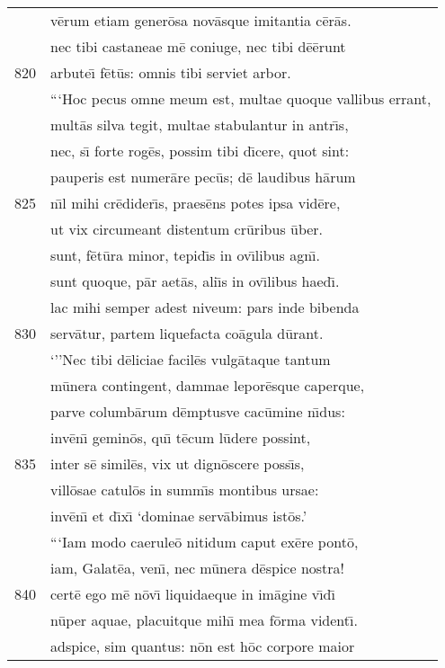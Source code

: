 \documentclass[paper=6in:9in,pagesize=pdftex,
               headinclude=on,footinclude=on,12pt]{scrbook}
\begin{document}
\begin{longtable}[p]{ r l }
 & v\=erum etiam gener\=osa nov\=asque imitantia c\=er\=as.\\ 
 & nec tibi castaneae m\=e coniuge, nec tibi d\=e\=erunt\\ 
820 & arbute\={\i} f\=et\=us: omnis tibi serviet arbor.\\ 
 & \indent ```Hoc pecus omne meum est, multae quoque vallibus errant,\\ 
 & mult\=as silva tegit, multae stabulantur in antr\={\i}s,\\ 
 & nec, s\={\i} forte rog\=es, possim tibi d\={\i}cere, quot sint:\\ 
 & pauperis est numer\=are pec\=us; d\=e laudibus h\=arum\\ 
825 & n\={\i}l mihi cr\=edider\={\i}s, praes\=ens potes ipsa vid\=ere,\\ 
 & ut vix circumeant distentum cr\=uribus \=uber.\\ 
 & sunt, f\=et\=ura minor, tepid\={\i}s in ov\={\i}libus agn\={\i}.\\ 
 & sunt quoque, p\=ar aet\=as, ali\={\i}s in ov\={\i}libus haed\={\i}.\\ 
 & lac mihi semper adest niveum: pars inde bibenda\\ 
830 & serv\=atur, partem liquefacta co\=agula d\=urant.\\ 
 & \indent `''Nec tibi d\=eliciae facil\=es vulg\=ataque tantum\\ 
 & m\=unera contingent, dammae lepor\=esque caperque,\\ 
 & parve columb\=arum d\=emptusve cac\=umine n\={\i}dus:\\ 
 & inv\=en\={\i} gemin\=os, qu\={\i} t\=ecum l\=udere possint,\\ 
835 & inter s\=e simil\=es, vix ut dign\=oscere poss\={\i}s,\\ 
 & vill\=osae catul\=os in summ\={\i}s montibus ursae:\\ 
 & inv\=en\={\i} et d\={\i}x\={\i} `dominae serv\=abimus ist\=os.'\\ 
 & \indent ```Iam modo caerule\=o nitidum caput ex\=ere pont\=o,\\ 
 & iam, Galat\=ea, ven\={\i}, nec m\=unera d\=espice nostra!\\ 
840 & cert\=e ego m\=e n\=ov\={\i} liquidaeque in im\=agine v\={\i}d\={\i}\\ 
 & n\=uper aquae, placuitque mih\={\i} mea f\=orma vident\={\i}.\\ 
 & adspice, sim quantus: n\=on est h\=oc corpore maior\\ 

\end{longtable}
\end{document}
